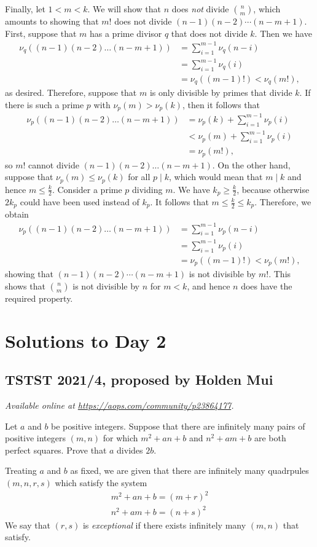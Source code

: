 \documentclass[11pt]{scrartcl}
\begin{document}
Finally,  let $1<m<k$.  We will show that $n$ does \emph{not} divide
$\binom{n}{m}$,  which amounts to showing that $m!$ does not divide $(n-1)(n-2)
\dotsm (n-m+1)$.  First,  suppose that $m$ has a prime divisor $q$ that does not divide $k$.  Then we have
\begin{align*}
  \nu_q\left( (n-1)(n-2) \dots (n-m+1) \right) &= \sum_{i=1}^{m-1} \nu_q(n-i) \\
  &= \sum_{i=1}^{m-1} \nu_q(i) \\
  &= \nu_q((m-1)!) < \nu_q(m!),
\end{align*}
as desired. Therefore,  suppose that $m$ is only divisible by primes that divide $k$.  If there is such a prime $p$ with $\nu_p(m) > \nu_p(k)$,  then it follows that
\begin{align*}
  \nu_p\left( (n-1)(n-2) \dots (n-m+1) \right)
  &= \nu_p(k) + \sum_{i=1}^{m-1} \nu_p(i) \\
  &< \nu_p(m) + \sum_{i=1}^{m-1}
  \nu_p(i) \\
  &= \nu_p(m!),
\end{align*}
so $m!$ cannot divide $(n-1)(n-2) \dots (n-m+1)$.  On the other hand,  suppose
that $\nu_p(m) \le \nu_p(k)$ for all $p \mid k$, which would mean that $m \mid
k$ and hence $m \le \frac{k}{2}$.  Consider a prime $p$ dividing $m$.  We have
$k_p \ge \frac{k}{2}$,  because otherwise $2k_p$ could have been used instead of
$k_p$. It follows that $m \le \frac{k}{2} \le k_p$. Therefore, we obtain
\begin{align*}
  \nu_p\left( (n-1)(n-2) \dots (n-m+1) \right) &= \sum_{i=1}^{m-1} \nu_p(n-i) \\
  &= \sum_{i=1}^{m-1} \nu_p(i)  \\
  &= \nu_p((m-1)!) < \nu_p(m!),
\end{align*}
showing that $(n-1)(n-2) \dotsm (n-m+1)$ is not divisible by $m!$.
This shows that $\binom{n}{m}$ is not divisible by $n$ for $m<k$,
and hence $n$ does have the required property.
\pagebreak

\section{Solutions to Day 2}
\subsection{TSTST 2021/4, proposed by Holden Mui}
\textsl{Available online at \url{https://aops.com/community/p23864177}.}
\begin{mdframed}[style=mdpurplebox,frametitle={Problem statement}]
Let $a$ and $b$ be positive integers.
Suppose that there are infinitely many pairs of positive integers $(m, n)$
for which $m^2+an+b$ and $n^2+am+b$ are both perfect squares.
Prove that $a$ divides $2b$.
\end{mdframed}
Treating $a$ and $b$ as fixed,
we are given that there are infinitely many quadrpules $(m,n,r,s)$
which satisfy the system
\begin{gather*}
  m^2+an+b=(m+r)^2 \\
  n^2+am+b=(n+s)^2
\end{gather*}
We say that $(r,s)$ is \emph{exceptional}
if there exists infinitely many $(m,n)$ that satisfy.
\end{document}
